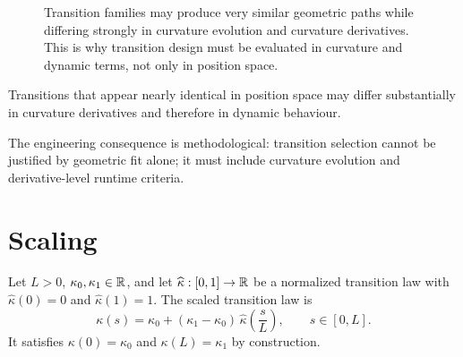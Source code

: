 \begin{figure}[ht]

\caption{
Transition families may produce very similar geometric paths while
differing strongly in curvature evolution and curvature derivatives.
This is why transition design must be evaluated in curvature and
dynamic terms, not only in position space.
}
\end{figure}

Transitions that appear nearly identical in position space may differ
substantially in curvature derivatives and therefore in dynamic
behaviour.

The engineering consequence is methodological: transition selection
cannot be justified by geometric fit alone; it must include curvature
evolution and derivative-level runtime criteria.

\section{Scaling}

\begin{definition}
\label{def:scaled-transition-law}
Let $L>0$, $\kappa_0,\kappa_1\in\mathbb{R}$, and let $\widehat{\kappa}:[0,1]\to\mathbb{R}$
be a normalized transition law with $\widehat{\kappa}(0)=0$ and
$\widehat{\kappa}(1)=1$. The scaled transition law is
\[
\kappa(s)
=
\kappa_0
+
(\kappa_1-\kappa_0)
\,
\widehat{\kappa}
\!\left(
\frac{s}{L}
\right),
\qquad s\in[0,L].
\]
It satisfies $\kappa(0)=\kappa_0$ and $\kappa(L)=\kappa_1$ by
construction.
\end{definition}

